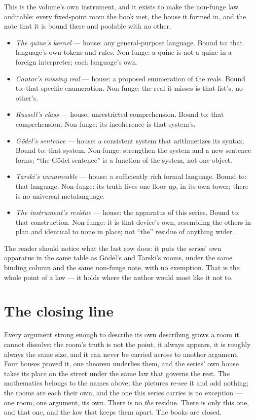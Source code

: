 This is the volume's own instrument, and it exists to make the non-funge
law auditable: every fixed-point room the book met, the house it formed
in, and the note that it is bound there and poolable with no other.

\begin{itemize}
\item \emph{The quine's kernel} --- house: any general-purpose language.
Bound to: that language's own tokens and rules. Non-funge: a quine is not
a quine in a foreign interpreter; each language's own.
\item \emph{Cantor's missing real} --- house: a proposed enumeration of
the reals. Bound to: that specific enumeration. Non-funge: the real it
misses is that list's, no other's.
\item \emph{Russell's class} --- house: unrestricted comprehension. Bound
to: that comprehension. Non-funge: its incoherence is that system's.
\item \emph{G\"odel's sentence} --- house: a consistent system that
arithmetizes its syntax. Bound to: that system. Non-funge: strengthen
the system and a new sentence forms; ``the G\"odel sentence'' is a
function of the system, not one object.
\item \emph{Tarski's unnameable} --- house: a sufficiently rich formal
language. Bound to: that language. Non-funge: its truth lives one floor
up, in its own tower; there is no universal metalanguage.
\item \emph{The instrument's residue} --- house: the apparatus of this
series. Bound to: that construction. Non-funge: it is that device's own,
resembling the others in plan and identical to none in place; not
``the'' residue of anything wider.
\end{itemize}

The reader should notice what the last row does: it puts the series' own
apparatus in the same table as G\"odel's and Tarski's rooms, under the
same binding column and the same non-funge note, with no exemption. That
is the whole point of a law --- it holds where the author would most like
it not to.

\section*{The closing line}

Every argument strong enough to describe its own describing grows a room
it cannot dissolve; the room's truth is not the point, it always appears,
it is roughly always the same size, and it can never be carried across to
another argument. Four houses proved it, one theorem underlies them, and
the series' own house takes its place on the street under the same law
that governs the rest. The mathematics belongs to the names above; the
pictures re-see it and add nothing; the rooms are each their own, and the
one this series carries is no exception --- one room, one argument, its
own. There is no \emph{the} residue. There is only this one, and that
one, and the law that keeps them apart. The books are closed.
